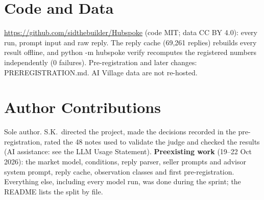 \documentclass[11pt]{article}
\newcommand{\code}[1]{{\small\ttfamily #1}}
\begin{document}
\section*{Code and Data}
\url{https://github.com/sidthebuilder/Hubspoke} (code MIT; data CC BY 4.0): every run, prompt input and raw reply. The reply cache (69,261 replies) rebuilds every result offline, and \code{python -m hubspoke verify} recomputes the registered numbers independently (0 failures). Pre-registration and later changes: \code{PREREGISTRATION.md}. AI Village data are not re-hosted.

\section*{Author Contributions}
Sole author. S.K.\ directed the project, made the decisions recorded in the pre-registration, rated the 48 notes used to validate the judge and checked the results (AI assistance: see the LLM Usage Statement). \textbf{Preexisting work} (19--22 Oct 2026): the market model, conditions, reply parser, seller prompts and advisor system prompt, reply cache, observation classes and first pre-registration. Everything else, including every model run, was done during the sprint; the README lists the split by file.
\end{document}
